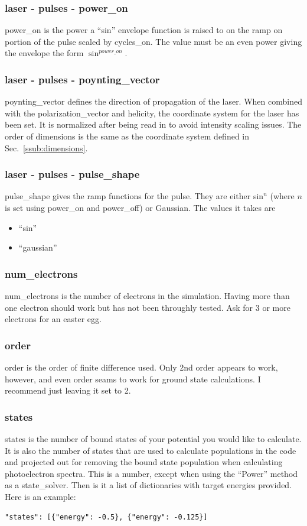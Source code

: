 \documentclass{article}
\begin{document}
\subsubsection{laser - pulses - power\_on}
power\_on is the power a ``sin'' envelope function is raised to on the ramp on portion of the pulse scaled by cycles\_on. The value must be an even power giving the envelope the form $\sin^{power\_on}$.

\subsubsection{laser - pulses - poynting\_vector}
poynting\_vector defines the direction of propagation of the laser. When combined with the polarization\_vector and helicity, the coordinate system for the laser has been set. It is normalized after being read in to avoid intensity scaling issues. The order of dimensions is the same as the coordinate system defined in Sec.~\ref{ssub:dimensions}.

\subsubsection{laser - pulses - pulse\_shape}
pulse\_shape gives the ramp functions for the pulse. They are either sin$^n$ (where $n$ is set using power\_on and power\_off) or Gaussian. The values it takes are
\begin{itemize}
  \item ``sin''
  \item ``gaussian''
\end{itemize}

\subsubsection{num\_electrons}
num\_electrons is the number of electrons in the simulation. Having more than one electron should work but has not been throughly tested. Ask for 3 or more electrons for an easter egg.

\subsubsection{order}
order is the order of finite difference used. Only 2nd order appears to work, however, and even order seams to work for ground state calculations. I recommend just leaving it set to 2.

\subsubsection{states}
states is the number of bound states of your potential you would like to calculate. It is also the number of states that are used to calculate populations in the code and projected out for removing the bound state population when calculating photoelectron spectra. This is a number, except when using the ``Power'' method as a state\_solver. Then is it a list of dictionaries with target energies provided. Here is an example:
\begin{verbatim}
"states": [{"energy": -0.5}, {"energy": -0.125}]
\end{verbatim}
\end{document}
